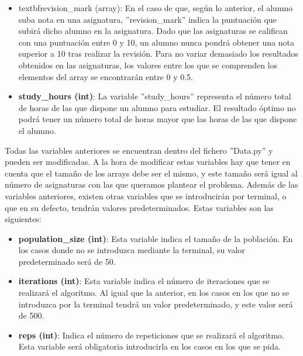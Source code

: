 \documentclass[11pt, a4paper, titlepage]{article}
\begin{document}
\begin{itemize}
\vspace{5mm}

\item textbf{revision\_mark (array)}: En el caso de que, según lo anterior, el alumno suba nota en una asignatura, ''revision\_mark'' indica la puntuación que subirá dicho alumno en la asignatura. Dado que las asignaturas se califican con una puntuación entre 0 y 10, un alumno nunca pondrá obtener una nota superior a 10 tras realizar la revisión. Para no variar demasiado los resultados obtenidos en las asignaturas, los valores entre los que se comprenden los elementos del array se encontrarán entre 0 y 0.5.

\vspace{5mm}

\item \textbf{study\_hours (int)}: La variable ''study\_hours'' representa el número total de horas de las que dispone un alumno para estudiar. El resultado óptimo no podrá tener un número total de horas mayor que las horas de las que dispone el alumno.

\end{itemize}

\vspace{5mm}

Todas las variables anteriores se encuentran dentro del fichero ''Data.py'' y pueden ser modificadas. A la hora de modificar estas variables hay que tener en cuenta que el tamaño de los arrays debe ser el mismo, y este tamaño será igual al número de asignaturas con las que queramos plantear el problema. Además de las variables anteriores, existen otras variables que se introducirán por terminal, o que en su defecto, tendrán valores predeterminados. Estas variables son las siguientes: 

\vspace{5mm}

\begin{itemize}
\renewcommand{\labelitemi}{$\circ$}

\item \textbf{population\_size (int)}: Esta variable indica el tamaño de la población. En los casos donde no se introduzca mediante la terminal, su valor predeterminado será de 50.

\vspace{5mm}

\item \textbf{iterations (int)}: Esta variable indica el número de iteraciones que se realizará el algoritmo. Al igual que la anterior, en los casos en los que no se introduzca por la terminal tendrá un valor predeterminado, y este valor será de 500.

\vspace{5mm}

\item \textbf{reps (int)}: Indica el número de repeticiones que se realizará el algoritmo. Esta variable será obligatoria introducirla en los casos en los que se pida.

\end{itemize}
\end{document}
